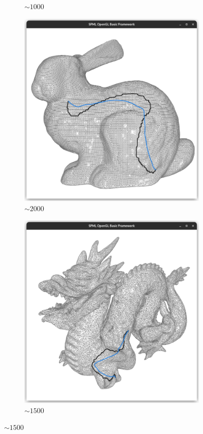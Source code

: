 \documentclass{stdlocal}
\begin{document}
\begin{figure}
\begin{subfigure}[b]{0.24\linewidth}
    \caption{$\sim 1000$}
  \end{subfigure}
  \begin{subfigure}[b]{0.24\linewidth}
    \centering
    \includegraphics[width=\linewidth,trim={25px 20 25 50},clip]{images/bunny-smooth-0.5.png}
    \caption{$\sim 2000$}
  \end{subfigure}
  \begin{subfigure}[b]{0.24\linewidth}
    \centering
    \includegraphics[width=\linewidth,trim={25px 20 25 50},clip]{images/dragon-smooth-0.5.png}
    \caption{$\sim 1500$}
  \end{subfigure}


\end{figure}
\end{document}
